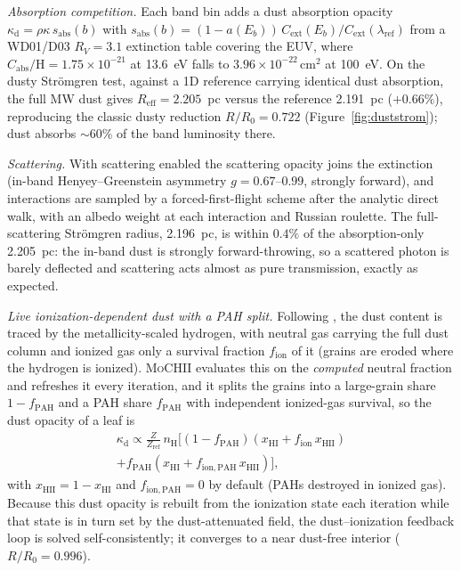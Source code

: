 \documentclass[twocolumn,linenumbers]{aastex702}
\newcommand{\MoCHII}{\textsc{MoCHII}}
\newcommand{\nH}{n_{\mathrm{H}}}
\newcommand{\xHI}{x_{\mathrm{HI}}}
\begin{document}
\emph{Absorption competition.}  Each band bin adds a dust absorption
opacity $\kappa_{\mathrm{d}} = \rho\kappa\,s_{\mathrm{abs}}(b)$ with
$s_{\mathrm{abs}}(b) = (1-a(E_b))\,C_{\mathrm{ext}}(E_b)/
C_{\mathrm{ext}}(\lambda_{\mathrm{ref}})$ from a WD01/D03 $R_V = 3.1$
extinction table \citep{weingartner2001,draine2003} covering the EUV, where
$C_{\mathrm{abs}}/\mathrm{H} = 1.75\times10^{-21}$ at 13.6~eV falls to
$3.96\times10^{-22}\,\mathrm{cm^2}$ at 100~eV.  On the dusty Str\"omgren
test, against a 1D reference carrying identical dust absorption, the full
MW dust gives $R_{\mathrm{eff}} = 2.205$~pc versus the reference 2.191~pc
($+0.66\%$), reproducing the classic dusty reduction $R/R_0 = 0.722$
(Figure~\ref{fig:duststrom}); dust absorbs $\sim$60\% of the band luminosity
there.

\emph{Scattering.}  With scattering enabled the scattering opacity joins
the extinction (in-band Henyey--Greenstein asymmetry $g = 0.67$--$0.99$,
strongly forward), and interactions are sampled by a forced-first-flight
scheme after the analytic direct walk, with an albedo weight at each
interaction and Russian roulette.  The full-scattering Str\"omgren radius,
2.196~pc, is within $0.4\%$ of the absorption-only 2.205~pc: the in-band
dust is strongly forward-throwing, so a scattered photon is barely deflected
and scattering acts almost as pure transmission, exactly as expected.

\emph{Live ionization-dependent dust with a PAH split.}  Following
\citet{laursen2009}, the dust content is traced by the metallicity-scaled
hydrogen, with neutral gas carrying the full dust column and ionized gas
only a survival fraction $f_{\mathrm{ion}}$ of it (grains are eroded where
the hydrogen is ionized).  \MoCHII{} evaluates this on the \emph{computed}
neutral fraction and refreshes it every iteration, and it splits the grains
into a large-grain share $1 - f_{\mathrm{PAH}}$ and a PAH share
$f_{\mathrm{PAH}}$ with independent ionized-gas survival, so the dust
opacity of a leaf is
\begin{multline}
  \kappa_{\mathrm{d}} \propto \frac{Z}{Z_{\mathrm{ref}}}\,\nH
  \big[(1 - f_{\mathrm{PAH}})(\xHI + f_{\mathrm{ion}}\,x_{\mathrm{HII}}) \\
  + f_{\mathrm{PAH}}(\xHI + f_{\mathrm{ion,PAH}}\,x_{\mathrm{HII}})\big],
\end{multline}%
with $x_{\mathrm{HII}} = 1 - \xHI$ and $f_{\mathrm{ion,PAH}} = 0$ by
default (PAHs destroyed in ionized gas).  Because this dust opacity is
rebuilt from the ionization state each iteration while that state is in
turn set by the dust-attenuated field, the dust--ionization feedback loop
is solved self-consistently; it converges to a near dust-free interior
($R/R_0 = 0.996$).
\end{document}
